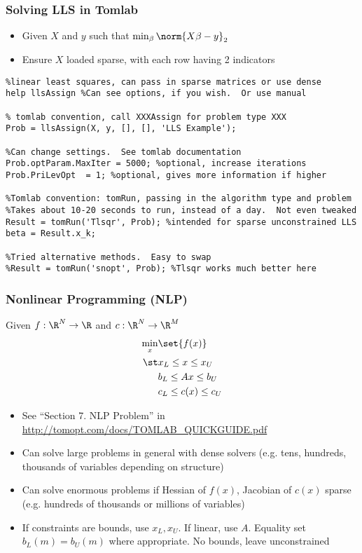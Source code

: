 \documentclass[nofootline]{etk-presentation}
\begin{document}
\begin{frame}[fragile]	\frametitle{Solving LLS in Tomlab}
	\begin{itemize}
		\item Given $X$ and $y$ such that $\min_\beta\norm{X \beta - y}_2$
		\item Ensure $X$ loaded sparse, with each row having 2 indicators
	\end{itemize}
\begin{verbatim}
%linear least squares, can pass in sparse matrices or use dense
help llsAssign %Can see options, if you wish.  Or use manual

% tomlab convention, call XXXAssign for problem type XXX
Prob = llsAssign(X, y, [], [], 'LLS Example'); 

%Can change settings.  See tomlab documentation
Prob.optParam.MaxIter = 5000; %optional, increase iterations
Prob.PriLevOpt  = 1; %optional, gives more information if higher

%Tomlab convention: tomRun, passing in the algorithm type and problem
%Takes about 10-20 seconds to run, instead of a day.  Not even tweaked
Result = tomRun('Tlsqr', Prob); %intended for sparse unconstrained LLS
beta = Result.x_k;

%Tried alternative methods.  Easy to swap
%Result = tomRun('snopt', Prob); %Tlsqr works much better here
\end{verbatim}

\end{frame}
	
\begin{frame}\frametitle{}
	\bigskip
	\bigskip
	\bigskip	
	\begin{center}
		{\huge {}}
	\end{center}
\end{frame}

\begin{frame}[fragile]	\frametitle{Nonlinear Programming (NLP)}
Given $f : \R^N \to \R$ and $c : \R^N \to \R^M$
	\begin{align*}
		\min_x &\set{f(x)}\\
		\st & x_L \leq x \leq x_U\\
		& b_L \leq A x \leq b_U\\
		& c_L \leq c(x) \leq c_U
	\end{align*}
	
	\begin{itemize}
		\item See ``Section 7. NLP Problem'' in \url{http://tomopt.com/docs/TOMLAB_QUICKGUIDE.pdf}
		\item Can solve large problems in general with dense solvers (e.g. tens, hundreds, thousands of variables depending on structure)
		\item Can solve enormous problems if Hessian of $f(x)$, Jacobian of $c(x)$ sparse (e.g. hundreds of thousands or millions of variables)
		\item If constraints are bounds, use $x_L, x_U$.  If linear, use $A$.  Equality set $b_L(m) = b_U(m)$ where appropriate.  No bounds, leave unconstrained 
	\end{itemize}
\end{frame}
\end{document}

